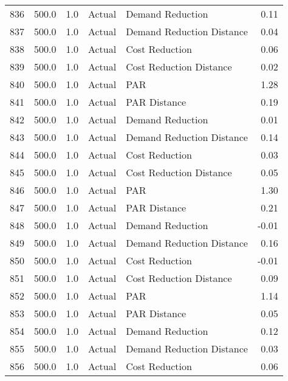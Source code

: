 \begin{longtable}{lrrllr}
836  &        500.0 &     1.0 &         Actual &           Demand Reduction &   0.11 \\
837  &        500.0 &     1.0 &         Actual &  Demand Reduction Distance &   0.04 \\
838  &        500.0 &     1.0 &         Actual &             Cost Reduction &   0.06 \\
839  &        500.0 &     1.0 &         Actual &    Cost Reduction Distance &   0.02 \\
840  &        500.0 &     1.0 &         Actual &                        PAR &   1.28 \\
841  &        500.0 &     1.0 &         Actual &               PAR Distance &   0.19 \\
842  &        500.0 &     1.0 &         Actual &           Demand Reduction &   0.01 \\
843  &        500.0 &     1.0 &         Actual &  Demand Reduction Distance &   0.14 \\
844  &        500.0 &     1.0 &         Actual &             Cost Reduction &   0.03 \\
845  &        500.0 &     1.0 &         Actual &    Cost Reduction Distance &   0.05 \\
846  &        500.0 &     1.0 &         Actual &                        PAR &   1.30 \\
847  &        500.0 &     1.0 &         Actual &               PAR Distance &   0.21 \\
848  &        500.0 &     1.0 &         Actual &           Demand Reduction &  -0.01 \\
849  &        500.0 &     1.0 &         Actual &  Demand Reduction Distance &   0.16 \\
850  &        500.0 &     1.0 &         Actual &             Cost Reduction &  -0.01 \\
851  &        500.0 &     1.0 &         Actual &    Cost Reduction Distance &   0.09 \\
852  &        500.0 &     1.0 &         Actual &                        PAR &   1.14 \\
853  &        500.0 &     1.0 &         Actual &               PAR Distance &   0.05 \\
854  &        500.0 &     1.0 &         Actual &           Demand Reduction &   0.12 \\
855  &        500.0 &     1.0 &         Actual &  Demand Reduction Distance &   0.03 \\
856  &        500.0 &     1.0 &         Actual &             Cost Reduction &   0.06 \\

\end{longtable}
